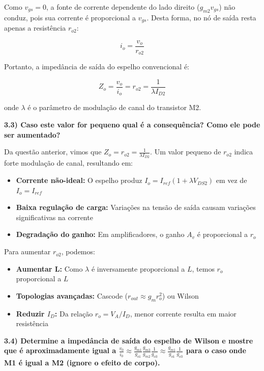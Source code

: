 \documentclass[12pt,a4paper]{article}
\begin{document}
Como $v_{gs} = 0$, a fonte de corrente dependente do lado direito ($g_{m2}v_{gs}$) não conduz, pois sua corrente é proporcional a $v_{gs}$. Desta forma, no nó de saída resta apenas a resistência $r_{o2}$:

\begin{equation*}
i_o = \frac{v_o}{r_{o2}}
\end{equation*}

Portanto, a impedância de saída do espelho convencional é:

\begin{equation}
Z_o = \frac{v_o}{i_o} = r_{o2} = \frac{1}{\lambda I_{D2}}
\end{equation}

onde $\lambda$ é o parâmetro de modulação de canal do transistor M2.

\textbf{3.3) Caso este valor for pequeno qual é a consequência? Como ele pode ser aumentado?}

Da questão anterior, vimos que $Z_o = r_{o2} = \frac{1}{\lambda I_{D2}}$. Um valor pequeno de $r_{o2}$ indica forte modulação de canal, resultando em:

\begin{itemize}
    \item \textbf{Corrente não-ideal:} O espelho produz $I_o = I_{ref}(1 + \lambda V_{DS2})$ em vez de $I_o = I_{ref}$
    \item \textbf{Baixa regulação de carga:} Variações na tensão de saída causam variações significativas na corrente
    \item \textbf{Degradação do ganho:} Em amplificadores, o ganho $A_v$ é proporcional a $r_o$
\end{itemize}

Para aumentar $r_{o2}$, podemos:

\begin{itemize}
    \item \textbf{Aumentar L:} Como $\lambda$ é inversamente proporcional a $L$, temos $r_o$ proporcional a $L$
    \item \textbf{Topologias avançadas:} Cascode ($r_{out} \approx g_m r_o^2$) ou Wilson
    \item \textbf{Reduzir $I_D$:} Da relação $r_o = V_A/I_D$, menor corrente resulta em maior resistência
\end{itemize}

\textbf{3.4) Determine a impedância de saída do espelho de Wilson e mostre que é aproximadamente igual a $\frac{v_{0}}{i_{0}} \approx \frac{g_{m1}}{g_{o1}} \frac{g_{m3}}{g_{m2}} \frac{1}{g_{o3}} \approx \frac{g_{m1}}{g_{o1}} \frac{1}{g_{o3}}$ para o caso onde M1 é igual a M2 (ignore o efeito de corpo).}
\end{document}
